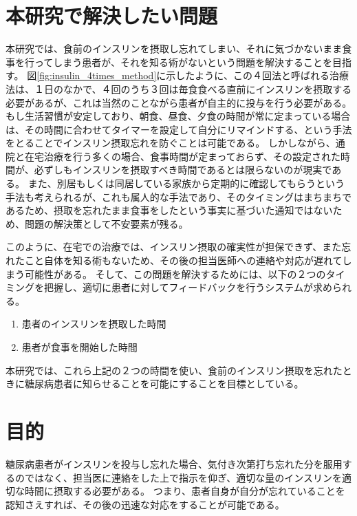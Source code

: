 \section{本研究で解決したい問題}
\label{section:problem}

本研究では、食前のインスリンを摂取し忘れてしまい、それに気づかないまま食事を行ってしまう患者が、それを知る術がないという問題を解決することを目指す。
図\ref{fig:insulin_4times_method}に示したように、この４回法と呼ばれる治療法は、１日のなかで、４回のうち３回は毎食食べる直前にインスリンを摂取する必要があるが、これは当然のことながら患者が自主的に投与を行う必要がある。
もし生活習慣が安定しており、朝食、昼食、夕食の時間が常に定まっている場合は、その時間に合わせてタイマーを設定して自分にリマインドする、という手法をとることでインスリン摂取忘れを防ぐことは可能である。
しかしながら、通院と在宅治療を行う多くの場合、食事時間が定まっておらず、その設定された時間が、必ずしもインスリンを摂取すべき時間であるとは限らないのが現実である。
また、別居もしくは同居している家族から定期的に確認してもらうという手法も考えられるが、これも属人的な手法であり、そのタイミングはまちまちであるため、摂取を忘れたまま食事をしたという事実に基づいた通知ではないため、問題の解決策として不安要素が残る。

このように、在宅での治療では、インスリン摂取の確実性が担保できず、また忘れたこと自体を知る術もないため、その後の担当医師への連絡や対応が遅れてしまう可能性がある。
そして、この問題を解決するためには、以下の２つのタイミングを把握し、適切に患者に対してフィードバックを行うシステムが求められる。

\begin{enumerate}
  \item 患者のインスリンを摂取した時間
  \item 患者が食事を開始した時間
\end{enumerate}

本研究では、これら上記の２つの時間を使い、食前のインスリン摂取を忘れたときに糖尿病患者に知らせることを可能にすることを目標としている。

\section{目的}
\label{section:purpose}

糖尿病患者がインスリンを投与し忘れた場合、気付き次第打ち忘れた分を服用するのではなく、担当医に連絡をした上で指示を仰ぎ、適切な量のインスリンを適切な時間に摂取する必要がある。
つまり、患者自身が自分が忘れていることを認知さえすれば、その後の迅速な対応をすることが可能である。


